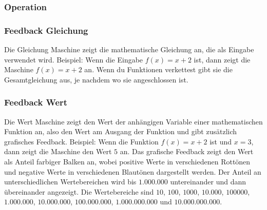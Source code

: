 \documentclass[12pt]{report}
\begin{document}
\subsubsection{Operation}
\subsubsection{Feedback Gleichung}
Die Gleichung Maschine zeigt die mathematische Gleichung an, die als Eingabe verwendet wird. Beispiel: Wenn die Eingabe $f(x) = x + 2$ ist, dann zeigt die Maschine $f(x) = x + 2$ an. Wenn du Funktionen verkettest gibt sie die Gesamtgleichung aus, je nachdem wo sie angeschlossen ist.
\subsubsection{Feedback Wert}
Die Wert Maschine zeigt den Wert der anhängigen Variable einer mathematischen Funktion an, also den Wert am Ausgang der Funktion und gibt zusätzlich grafisches Feedback. 
Beispiel: Wenn die Funktion $f(x) = x + 2$ ist und $x = 3$, dann zeigt die Maschine den Wert $5$ an. 
Das grafische Feedback zeigt den Wert als Anteil farbiger Balken an, wobei positive Werte in verschiedenen Rottönen und negative Werte in verschiedenen Blautönen dargestellt werden. Der Anteil an unterschiedlichen Wertebereichen wird bis $1.000.000$ untereinander und dann übereinander angezeigt. Die Wertebereiche sind $10$, $100$, $1000$, $10.000$, $100000$, $1.000.000$, $10.000.000$, $100.000.000$, $1.000.000.000$ und $10.000.000.000$.
\end{document}
